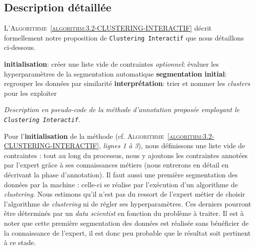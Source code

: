 	
	\subsection{Description détaillée}
	\label{section:3.2.2-DESCRIPTION-THEORIQUE-DETAILLEE}
	
		L'\textsc{Algorithme~\ref{algorithm:3.2-CLUSTERING-INTERACTIF}} décrit formellement notre proposition de \texttt{Clustering Interactif} que nous détaillons ci-dessous.
		\begin{algorithm}
			\textbf{initialisation}: créer une liste vide de contraintes \;
			\textit{optionnel}: évaluer les hyperparamètres de la segmentation automatique \;
			\textbf{segmentation initial}: regrouper les données par similarité \;
			\textbf{interprétation}: trier et nommer les \textit{clusters} pour les exploiter \;
			\caption{\textit{
				Description en pseudo-code de la méthode d'annotation proposée employant le \texttt{Clustering Interactif}.
			}}
			\label{algorithm:3.2-CLUSTERING-INTERACTIF}
		\end{algorithm}
		
		Pour l'\textbf{initialisation} de la méthode (cf. \textsc{Algorithme~\ref{algorithm:3.2-CLUSTERING-INTERACTIF}}, \textit{lignes 1 à 3}), nous définissons une liste vide de contraintes : tout au long du processus, nous y ajoutons les contraintes annotées par l'expert grâce à ses connaissances métiers (nous entrerons en détail en décrivant la phase d'annotation).
		Il faut aussi une première segmentation des données par la machine : celle-ci se réalise par l'exécution d'un algorithme de \textit{clustering}.
		Nous estimons qu'il n'est pas du ressort de l'expert métier de choisir l'algorithme de \textit{clustering} ni de régler ses hyperparamètres.
		Ces derniers pourront être déterminés par un \textit{data scientist} en fonction du problème à traiter.
		Il est à noter que cette première segmentation des données est réalisée sans bénéficier de la connaissance de l'expert, il est donc peu probable que le résultat soit pertinent à ce stade.
		

